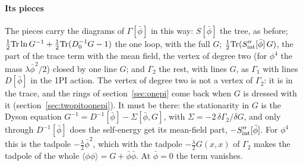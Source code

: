\documentclass[11pt,a4paper]{article}
\begin{document}
\paragraph{Its pieces} The pieces carry the diagrams of $\Gamma[\bar\phi]$ in this way: $S[\bar\phi]$ the tree, as before;
$\frac12{\rm Tr}\ln G^{-1}+\frac12{\rm Tr}(D_0^{-1}G-1)$ the one loop, with the full $G$; $\frac12{\rm Tr}(S_{\rm int}''[\bar\phi]\,G)$, the
part of the trace term with the mean field, the vertex of degree two (for $\phi^4$ the mass $\lambda\bar\phi^2/2$) closed by one
line $G$; and $\Gamma_2$ the rest, with lines $G$, as $\Gamma_1$ with lines $D[\bar\phi]$ in the 1PI action. The vertex of degree two is not a vertex of $\Gamma_2$: it is in the trace, and the rings of
section~\ref{sec:onepi} come back when $G$ is dressed with it (section~\ref{sec:twopitoonepi}). It must be there: the stationarity
in $G$ is the Dyson equation $G^{-1}=D^{-1}[\bar\phi]-\Sigma[\bar\phi,G]$, with $\Sigma=-2\,\delta\Gamma_2/\delta G$, and only through
$D^{-1}[\bar\phi]$ does the self-energy get its mean-field part, $-S_{\rm int}''[\bar\phi]$. For $\phi^4$ this is the tadpole
$-\frac\lambda2\bar\phi^2$, which with the tadpole $-\frac\lambda2G(x,x)$ of $\Gamma_2$ makes the tadpole of the whole
$\langle\phi\phi\rangle=G+\bar\phi\bar\phi$. At $\bar\phi=0$ the term vanishes.
\end{document}
